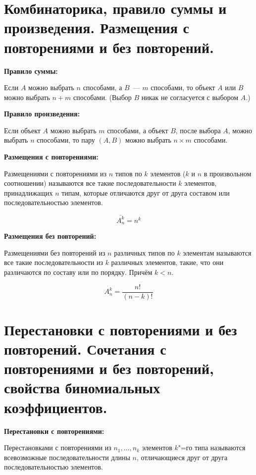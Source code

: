 


    
\tableofcontents

\newpage

\section{Комбинаторика, правило суммы и произведения.
Размещения с повторениями и без повторений.}

\textbf{Правило суммы:}
    \smallskip

    Если $A$ можно выбрать $n$ способами, а $B$~--- $m$ способами, то объект 
    $A$ или $B$ можно выбрать $n + m$ способами. (Выбор $B$ никак не
    согласуется с выбором $A$.)
    \bigskip

\textbf{Правило произведения:}
    \smallskip

    Если объект $A$ можно выбрать $m$ способами, а объект $B$, после выбора $A$, 
    можно выбрать $n$ способами, то пару $(A, B)$ можно выбрать $n \times m$
    способами.
    \bigskip

\textbf{Размещения с повторениями:}
    \smallskip
    
    Размещениями с повторениями из $n$ типов по $k$ элементов ($k$ и $n$ в произвольном
    соотношении) называются все такие последовательности $k$ элементов,
    принадлижащих $n$ типам, которые отличаются друг от друга составом
    или последовательностью элементов. 
    
    \[
        \overline{A^{k}_n} = n^k 
    \]
    \bigskip

\textbf{Размещения без повторений:}
    \smallskip
    
    Размещениями без повторений из $n$ различных типов по $k$ элементам называются
    все такие последовательности из $k$ различных элементов, такие, что они
    различаются по составу или по порядку. Причём $k < n$.

    \[
        A^k_n = \frac{n!}{(n - k)!}  
    \]

\section{Перестановки с повторениями и без повторений. Сочетания с повторениями 
и без повторений, свойства биномиальных коэффициентов.}

\textbf{Перестановки с повторениями:}
    \smallskip

    Перестановками с повторениями из $n_1, \dots, n_k$ элементов $k$"=го типа 
    называются всевозможные последовательности длины $n$, отличающиеся друг от
    друга последовательностью элементов.

